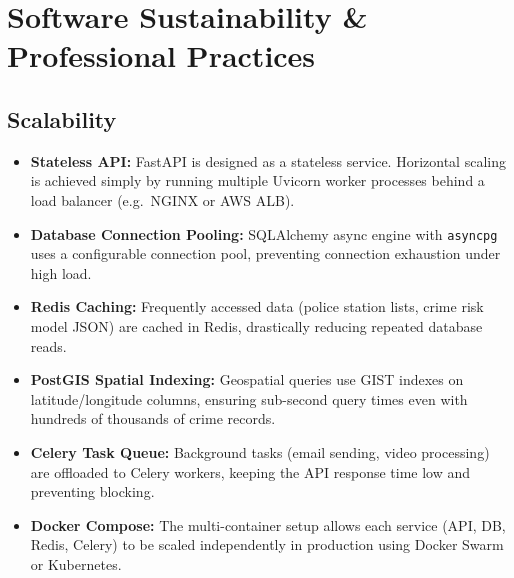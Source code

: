 \documentclass[12pt,a4paper]{report}
\begin{document}
\chapter{Software Sustainability \& Professional Practices}

\section{Scalability}
\begin{itemize}[leftmargin=*]
    \item \textbf{Stateless API:} FastAPI is designed as a stateless service. Horizontal scaling is achieved simply by running multiple Uvicorn worker processes behind a load balancer (e.g.\ NGINX or AWS ALB).
    \item \textbf{Database Connection Pooling:} SQLAlchemy async engine with \texttt{asyncpg} uses a configurable connection pool, preventing connection exhaustion under high load.
    \item \textbf{Redis Caching:} Frequently accessed data (police station lists, crime risk model JSON) are cached in Redis, drastically reducing repeated database reads.
    \item \textbf{PostGIS Spatial Indexing:} Geospatial queries use GIST indexes on latitude/longitude columns, ensuring sub-second query times even with hundreds of thousands of crime records.
    \item \textbf{Celery Task Queue:} Background tasks (email sending, video processing) are offloaded to Celery workers, keeping the API response time low and preventing blocking.
    \item \textbf{Docker Compose:} The multi-container setup allows each service (API, DB, Redis, Celery) to be scaled independently in production using Docker Swarm or Kubernetes.
\end{itemize}
\end{document}
